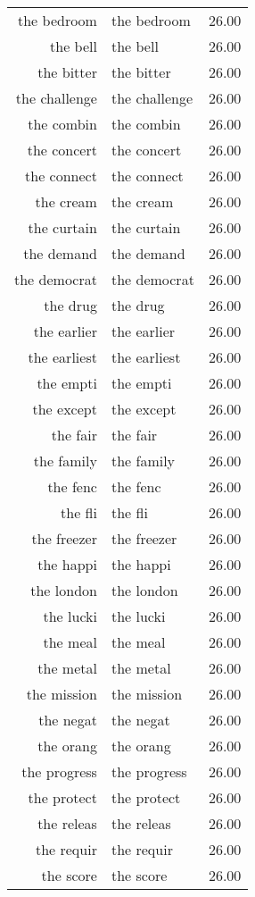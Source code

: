 \begin{table}[ht]
\begin{tabular}{rlr}
  the bedroom & the bedroom & 26.00 \\ 
  the bell & the bell & 26.00 \\ 
  the bitter & the bitter & 26.00 \\ 
  the challenge & the challenge & 26.00 \\ 
  the combin & the combin & 26.00 \\ 
  the concert & the concert & 26.00 \\ 
  the connect & the connect & 26.00 \\ 
  the cream & the cream & 26.00 \\ 
  the curtain & the curtain & 26.00 \\ 
  the demand & the demand & 26.00 \\ 
  the democrat & the democrat & 26.00 \\ 
  the drug & the drug & 26.00 \\ 
  the earlier & the earlier & 26.00 \\ 
  the earliest & the earliest & 26.00 \\ 
  the empti & the empti & 26.00 \\ 
  the except & the except & 26.00 \\ 
  the fair & the fair & 26.00 \\ 
  the family & the family & 26.00 \\ 
  the fenc & the fenc & 26.00 \\ 
  the fli & the fli & 26.00 \\ 
  the freezer & the freezer & 26.00 \\ 
  the happi & the happi & 26.00 \\ 
  the london & the london & 26.00 \\ 
  the lucki & the lucki & 26.00 \\ 
  the meal & the meal & 26.00 \\ 
  the metal & the metal & 26.00 \\ 
  the mission & the mission & 26.00 \\ 
  the negat & the negat & 26.00 \\ 
  the orang & the orang & 26.00 \\ 
  the progress & the progress & 26.00 \\ 
  the protect & the protect & 26.00 \\ 
  the releas & the releas & 26.00 \\ 
  the requir & the requir & 26.00 \\ 
  the score & the score & 26.00 \\ 

\end{tabular}
\end{table}
